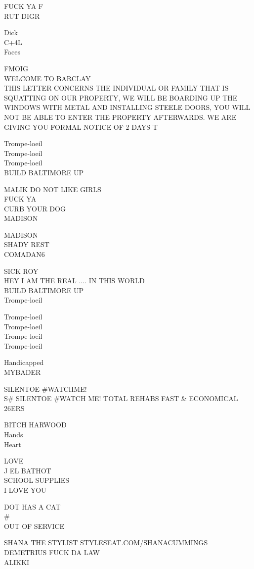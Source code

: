 \documentclass[10pt,letterpaper]{article}
\begin{document}
FUCK YA F\\
RUT DIGR

Dick\\
C+4L\\
Faces

FMOIG\\
WELCOME TO BARCLAY\\
THIS LETTER CONCERNS THE INDIVIDUAL OR FAMILY THAT IS SQUATTING ON OUR PROPERTY, WE WILL BE BOARDING UP THE WINDOWS WITH METAL AND INSTALLING STEELE DOORS, YOU WILL NOT BE ABLE TO ENTER THE PROPERTY AFTERWARDS.  WE ARE GIVING YOU FORMAL NOTICE OF 2 DAYS T

Trompe{-}loeil\\
Trompe{-}loeil\\
Trompe{-}loeil\\
BUILD BALTIMORE UP

MALIK DO NOT LIKE GIRLS\\
FUCK YA\\
CURB YOUR DOG\\
MADISON

MADISON\\
SHADY REST\\
COMADAN6

SICK ROY\\
HEY I AM THE REAL .... IN THIS WORLD\\
BUILD BALTIMORE UP\\
Trompe{-}loeil

Trompe{-}loeil\\
Trompe{-}loeil\\
Trompe{-}loeil\\
Trompe{-}loeil

Handicapped\\
MYBADER

SILENTOE \#WATCHME!\\
S\# SILENTOE \#WATCH ME! TOTAL REHABS FAST \& ECONOMICAL\\
26ERS

BITCH HARWOOD\\
Hands\\
Heart

LOVE\\
J EL BATHOT\\
SCHOOL SUPPLIES\\
I LOVE YOU

DOT HAS A CAT\\
\#\\
OUT OF SERVICE

SHANA THE STYLIST STYLESEAT.COM/SHANACUMMINGS\\
DEMETRIUS FUCK DA LAW\\
ALIKKI
\end{document}
